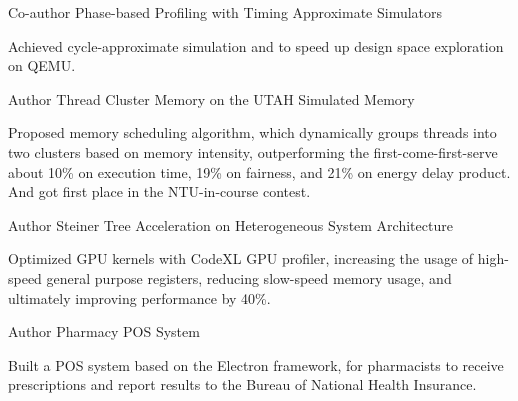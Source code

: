 

\begin{cventries}

  \cventry
    {Co-author} %
    {Phase-based Profiling with Timing Approximate Simulators} %
    {} %
    {} %
    {
      \begin{cvitems} %
        \item {Achieved cycle-approximate simulation and to speed up design space
          exploration on QEMU.}
      \end{cvitems}
    }

  \cventry
    {Author} %
    {Thread Cluster Memory on the UTAH Simulated Memory} %
    {} %
    {} %
    {
      \begin{cvitems} %
        \item {Proposed memory scheduling algorithm, which dynamically groups threads into
  two clusters based on memory intensity, outperforming the
  first-come-first-serve about 10\% on execution time, 19\% on fairness, and
  21\% on energy delay product. And got first place in the NTU-in-course contest.}
      \end{cvitems}
    }

  \cventry
    {Author} %
    {Steiner Tree Acceleration on Heterogeneous System Architecture} %
    {} %
    {} %
    {
      \begin{cvitems} %
        \item {Optimized GPU kernels with CodeXL GPU profiler, increasing the usage of
  high-speed general purpose registers, reducing slow-speed memory usage, and
  ultimately improving performance by 40\%.}
      \end{cvitems}
    }

  \cventry
    {Author} %
    {Pharmacy POS System} %
    {} %
    {} %
    {
      \begin{cvitems} %
        \item {Built a POS system based on the Electron framework, for pharmacists to
  receive prescriptions and report results to the Bureau of National Health
Insurance.}
      \end{cvitems}
    }

\end{cventries}
